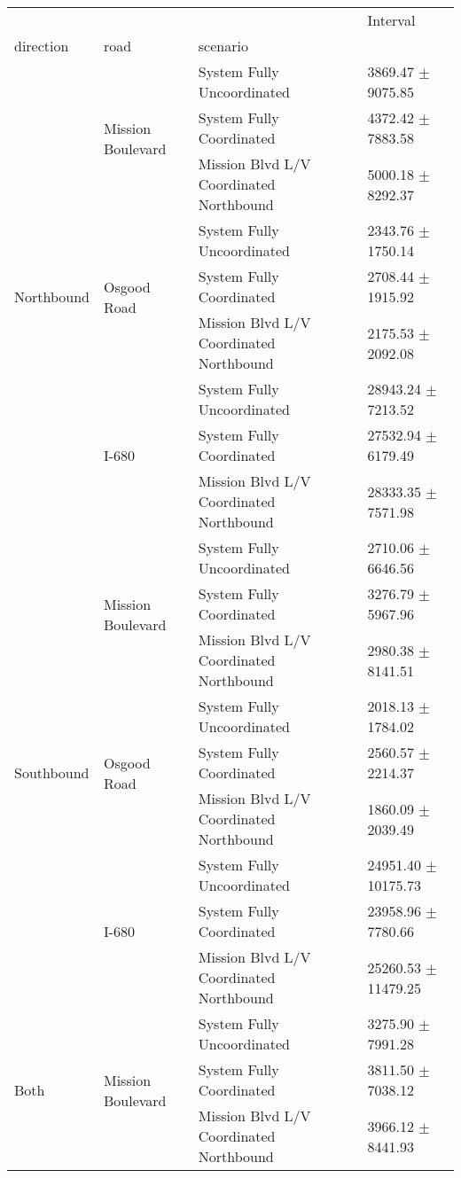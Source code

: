 \begin{tabular}{llll}
\toprule
 &  &  & Interval \\
direction & road & scenario &  \\
\midrule
\multirow[t]{9}{*}{Northbound} & \multirow[t]{3}{*}{Mission Boulevard} & System Fully Uncoordinated & 3869.47 $\pm$ 9075.85 \\
 &  & System Fully Coordinated & 4372.42 $\pm$ 7883.58 \\
 &  & Mission Blvd L/V Coordinated Northbound & 5000.18 $\pm$ 8292.37 \\
 & \multirow[t]{3}{*}{Osgood Road} & System Fully Uncoordinated & 2343.76 $\pm$ 1750.14 \\
 &  & System Fully Coordinated & 2708.44 $\pm$ 1915.92 \\
 &  & Mission Blvd L/V Coordinated Northbound & 2175.53 $\pm$ 2092.08 \\
 & \multirow[t]{3}{*}{I-680} & System Fully Uncoordinated & 28943.24 $\pm$ 7213.52 \\
 &  & System Fully Coordinated & 27532.94 $\pm$ 6179.49 \\
 &  & Mission Blvd L/V Coordinated Northbound & 28333.35 $\pm$ 7571.98 \\
\multirow[t]{9}{*}{Southbound} & \multirow[t]{3}{*}{Mission Boulevard} & System Fully Uncoordinated & 2710.06 $\pm$ 6646.56 \\
 &  & System Fully Coordinated & 3276.79 $\pm$ 5967.96 \\
 &  & Mission Blvd L/V Coordinated Northbound & 2980.38 $\pm$ 8141.51 \\
 & \multirow[t]{3}{*}{Osgood Road} & System Fully Uncoordinated & 2018.13 $\pm$ 1784.02 \\
 &  & System Fully Coordinated & 2560.57 $\pm$ 2214.37 \\
 &  & Mission Blvd L/V Coordinated Northbound & 1860.09 $\pm$ 2039.49 \\
 & \multirow[t]{3}{*}{I-680} & System Fully Uncoordinated & 24951.40 $\pm$ 10175.73 \\
 &  & System Fully Coordinated & 23958.96 $\pm$ 7780.66 \\
 &  & Mission Blvd L/V Coordinated Northbound & 25260.53 $\pm$ 11479.25 \\
\multirow[t]{9}{*}{Both} & \multirow[t]{3}{*}{Mission Boulevard} & System Fully Uncoordinated & 3275.90 $\pm$ 7991.28 \\
 &  & System Fully Coordinated & 3811.50 $\pm$ 7038.12 \\
 &  & Mission Blvd L/V Coordinated Northbound & 3966.12 $\pm$ 8441.93 \\

\end{tabular}
